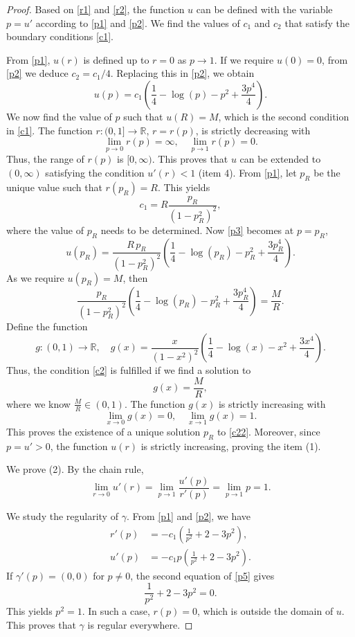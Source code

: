 \documentclass[a4paper,12pt]{amsart}
\theoremstyle{definition}
\def\r{\mathbb R}
\begin{document}
\begin{proof}
Based on \eqref{r1} and \eqref{r2}, the function $u$ can be defined with the variable $p=u'$ according to \eqref{p1} and \eqref{p2}. We find the values of $c_1$ and $c_2$ that satisfy the boundary conditions \eqref{c1}. 

From \eqref{p1}, $u(r)$ is defined up to  $r=0$ as $p\to 1$. If we require $u(0)=0$,  from \eqref{p2} we deduce $c_2=c_1/4$. Replacing this in \eqref{p2}, we obtain 
\begin{equation}\label{p3}
u(p)=c_1\left(\frac14-\log(p)-p^2+\frac{3p^4}{4}\right).
\end{equation}
We now find the value of $p$ such that $u(R)=M$, which  is the second condition in \eqref{c1}. The function   $r\colon (0,1]\to\r$, $r=r(p)$, is  strictly decreasing with 
$$\lim_{p\to 0}r(p)=\infty,\quad \lim_{p\to 1}r(p)=0.$$
Thus,   the range of $r(p)$ is $[0,\infty)$. This proves that $u$ can be extended to $(0,\infty)$ satisfying the condition $u'(r)<1$ (item 4). From \eqref{p1}, let $p_R$ be the unique value such that 
$r(p_R)=R$. This yields 
\begin{equation}\label{c111}
c_1=R\frac{p_R}{(1-p_R^2)^2},
\end{equation}
where the value of $p_R$ needs to be determined.  Now \eqref{p3} becomes at $p=p_R$, 
$$u(p_R)=\frac{  R\, p_R}{(1-p_R^2)^2}\left(\frac14-\log(p_R)-p_R^2+\frac{3p_R^4}{4}\right).$$
As we require   $u(p_R)=M$, then  
\begin{equation}\label{c2}
\frac{p_R}{(1-p_R^2)^2}\left(\frac14-\log(p_R)-p_R^2+\frac{3p_R^4}{4}\right)=\frac{M}{R}.
\end{equation}
Define the function  
$$g\colon (0,1)\to\r,\quad g(x)=\frac{x}{(1-x^2)^2}\left(\frac14-\log(x)-x^2+\frac{3x^4}{4}\right).$$
Thus, the condition \eqref{c2} is fulfilled if we find a solution to 
\begin{equation}\label{c22}
g(x)=\frac{M}{R},\end{equation}
where we know $\frac{M}{R}\in (0,1)$.
The function $g(x)$ is strictly increasing with 
$$\lim_{x\to 0}g(x)=0,\quad \lim_{x\to 1}g(x)=1.$$
 This proves the existence of a unique solution  $p_R$ to \eqref{c22}.  Moreover, since $p=u'>0$, the function $u(r)$ is strictly increasing, proving the item (1).

 We prove (2). By the chain rule,  
$$\lim_{r\to 0}u'(r)=\lim_{p\to 1}\frac{u'(p)}{r'(p)}=\lim_{p\to 1}p= 1.$$

 
We study the regularity of $\gamma$. From \eqref{p1} and \eqref{p2}, we have   
\begin{equation}\label{p5}
\begin{split}
r'(p)&=-c_1(\frac{1}{p^2}+2-3p^2),\\
u'(p)&=-c_1p(\frac{1}{p^2}+2-3p^2).
\end{split}
\end{equation}
If   $\gamma'(p)=(0,0)$ for $p\not=0$,   the   second equation of \eqref{p5} gives  
\begin{equation}\label{p4}
\frac{1}{p^2}+2-3p^2=0.
\end{equation}
 This yields $p^2=1$. In such a case, $r(p)=0$, which  is outside the domain of $u$.   This proves that $\gamma$ is regular everywhere.


\end{proof}
\end{document}
